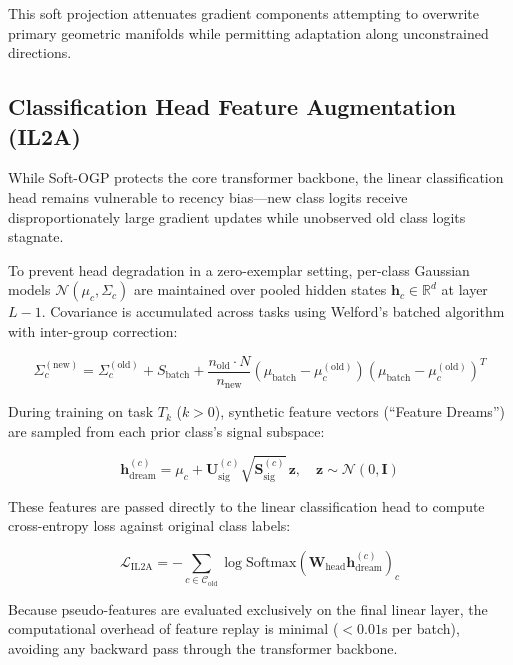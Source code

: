 \documentclass[11pt,a4paper]{article}
\begin{document}
This soft projection attenuates gradient components attempting to overwrite primary geometric manifolds while permitting adaptation along unconstrained directions.

\subsection{Classification Head Feature Augmentation (IL2A)}

While Soft-OGP protects the core transformer backbone, the linear classification head remains vulnerable to recency bias---new class logits receive disproportionately large gradient updates while unobserved old class logits stagnate.

To prevent head degradation in a zero-exemplar setting, per-class Gaussian models $\mathcal{N}(\mu_c, \Sigma_c)$ are maintained over pooled hidden states $\mathbf{h}_c \in \mathbb{R}^d$ at layer $L-1$. Covariance is accumulated across tasks using Welford's batched algorithm \citep{welford1962note} with inter-group correction:

\begin{equation}
\Sigma_c^{(\text{new})} = \Sigma_c^{(\text{old})} + S_{\text{batch}} + \frac{n_{\text{old}} \cdot N}{n_{\text{new}}} (\mu_{\text{batch}} - \mu_c^{(\text{old})})(\mu_{\text{batch}} - \mu_c^{(\text{old})})^T
\end{equation}

During training on task $T_k$ ($k > 0$), synthetic feature vectors (``Feature Dreams'') are sampled from each prior class's signal subspace:

\begin{equation}
\mathbf{h}_{\text{dream}}^{(c)} = \mu_c + \mathbf{U}_{\text{sig}}^{(c)} \sqrt{\mathbf{S}_{\text{sig}}^{(c)}} \, \mathbf{z}, \quad \mathbf{z} \sim \mathcal{N}(0, \mathbf{I})
\end{equation}

These features are passed directly to the linear classification head to compute cross-entropy loss against original class labels:

\begin{equation}
\mathcal{L}_{\text{IL2A}} = -\sum_{c \in \mathcal{C}_{\text{old}}} \log \text{Softmax}\left(\mathbf{W}_{\text{head}} \mathbf{h}_{\text{dream}}^{(c)}\right)_c
\end{equation}

Because pseudo-features are evaluated exclusively on the final linear layer, the computational overhead of feature replay is minimal (${<}0.01$s per batch), avoiding any backward pass through the transformer backbone.
\end{document}
